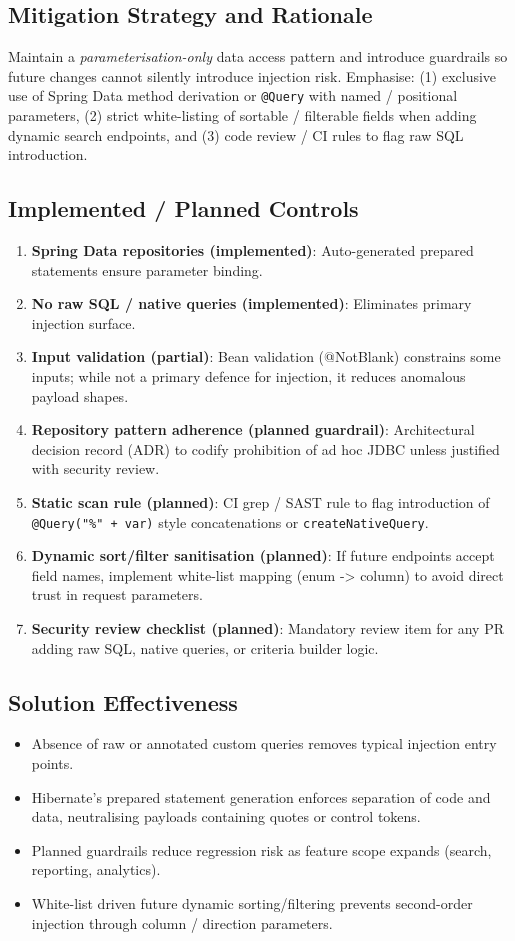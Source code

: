 \documentclass[]{UCD_CS_FYP_Report}
\begin{document}
\subsection*{Mitigation Strategy and Rationale}
Maintain a \textit{parameterisation-only} data access pattern and introduce guardrails so future changes cannot silently introduce injection risk. Emphasise: (1) exclusive use of Spring Data method derivation or \texttt{@Query} with named / positional parameters, (2) strict white-listing of sortable / filterable fields when adding dynamic search endpoints, and (3) code review / CI rules to flag raw SQL introduction.

\subsection*{Implemented / Planned Controls}
\begin{enumerate}
 \item \textbf{Spring Data repositories (implemented)}: Auto-generated prepared statements ensure parameter binding.
 \item \textbf{No raw SQL / native queries (implemented)}: Eliminates primary injection surface.
 \item \textbf{Input validation (partial)}: Bean validation (@NotBlank) constrains some inputs; while not a primary defence for injection, it reduces anomalous payload shapes.
 \item \textbf{Repository pattern adherence (planned guardrail)}: Architectural decision record (ADR) to codify prohibition of ad hoc JDBC unless justified with security review.
 \item \textbf{Static scan rule (planned)}: CI grep / SAST rule to flag introduction of \texttt{@Query("\%" + var)} style concatenations or \texttt{createNativeQuery}.
 \item \textbf{Dynamic sort/filter sanitisation (planned)}: If future endpoints accept field names, implement white-list mapping (enum -> column) to avoid direct trust in request parameters.
 \item \textbf{Security review checklist (planned)}: Mandatory review item for any PR adding raw SQL, native queries, or criteria builder logic.
\end{enumerate}


\subsection*{Solution Effectiveness}
\begin{itemize}
 \item Absence of raw or annotated custom queries removes typical injection entry points.
 \item Hibernate's prepared statement generation enforces separation of code and data, neutralising payloads containing quotes or control tokens.
 \item Planned guardrails reduce regression risk as feature scope expands (search, reporting, analytics).
 \item White-list driven future dynamic sorting/filtering prevents second-order injection through column / direction parameters.
\end{itemize}
\end{document}
